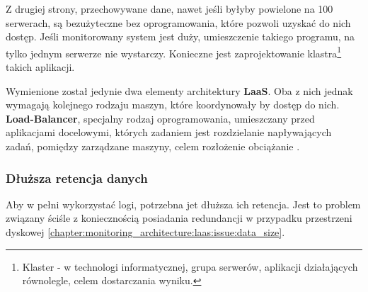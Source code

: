     Z drugiej strony, przechowywane dane, nawet jeśli byłyby powielone na 100 serwerach, są bezużyteczne bez oprogramowania, które
    pozwoli uzyskać do nich dostęp. Jeśli monitorowany system jest duży, umieszczenie takiego programu, na tylko jednym serwerze nie wystarczy.
    Konieczne jest zaprojektowanie klastra\footnote{Klaster - w technologi informatycznej, grupa serwerów, aplikacji działających równolegle, celem dostarczania wyniku.} takich aplikacji. 
    
    Wymienione został jedynie dwa elementy architektury \textbf{LaaS}. Oba z nich jednak wymagają kolejnego rodzaju maszyn, które koordynowały by dostęp do nich.
    \textbf{Load-Balancer}, specjalny rodzaj oprogramowania, umieszczany przed aplikacjami docelowymi, których zadaniem jest 
    rozdzielanie napływających zadań, pomiędzy zarządzane maszyny, celem rozłożenie obciążanie \cite{log_management_to_build_or_to_buy}.
    
    \subsubsection{Dłuższa retencja danych}
    Aby w pełni wykorzystać logi, potrzebna jet dłuższa ich retencja. Jest to problem związany ściśle z koniecznością posiadania
    redundancji w przypadku przestrzeni dyskowej \ref{chapter:monitoring_architecture:laas:issue:data_size}.